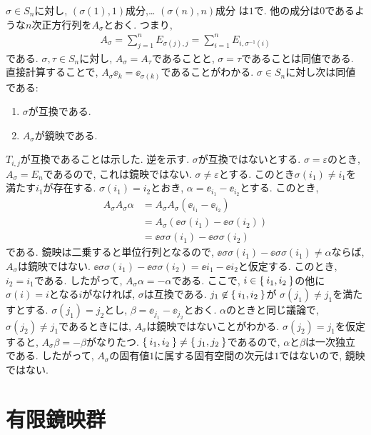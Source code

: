 \begin{example}
  $\sigma \in S_n$に対し,
  $(\sigma(1),1)$成分,\ldots
  $(\sigma(n),n)$成分
  は$1$で. 他の成分は$0$であるような$n$次正方行列を$A_\sigma$とおく.
  つまり,
  \begin{align*}
    A_\sigma = \sum_{j=1}^{n} E_{\sigma(j),j} = \sum_{i=1}^{n} E_{i,\sigma^{-1}(i)}
  \end{align*}
  である.
  $\sigma,\tau\in S_n$に対し, $A_\sigma=A_\tau$であることと,
  $\sigma=\tau$であることは同値である.
  直接計算することで,
  $A_\sigma \ee_k=\ee_{\sigma(k)}$であることがわかる.
  $\sigma\in S_n$に対し次は同値である:
  \begin{enumerate}
  \item $\sigma$が互換である.
  \item $A_\sigma$が鏡映である.
  \end{enumerate}
  $T_{i,j}$が互換であることは示した.
  逆を示す.
  $\sigma$が互換ではないとする.
  $\sigma=\varepsilon$のとき, $A_\sigma=E_n$であるので, これは鏡映ではない.
  $\sigma\neq\varepsilon$とする.
  このとき$\sigma(i_1)\neq i_1$を満たす$i_1$が存在する.
  $\sigma(i_1)=i_2$とおき,
  $\alpha=\ee_{i_1}-\ee_{i_2}$とする.
  このとき,
  \begin{align*}
    A_\sigma A_\sigma\alpha
    &= A_\sigma A_\sigma (\ee_{i_1}-\ee_{i_2})\\
    &= A_\sigma(\ee{\sigma(i_1)}-\ee{\sigma(i_2)})\\
    &= \ee{\sigma\sigma(i_1)}-\ee{\sigma\sigma(i_2)}
  \end{align*}
  である. 鏡映は二乗すると単位行列となるので,
  $\ee{\sigma\sigma(i_1)}-\ee{\sigma\sigma(i_1)}\neq \alpha$ならば,
  $A_\sigma$は鏡映ではない.
  $\ee{\sigma\sigma(i_1)}-\ee{\sigma\sigma(i_2)}=\ee{i_1}-\ee{i_2}$と仮定する.
  このとき, $i_2=i_1$である.
  したがって,  $A_\sigma \alpha = -\alpha$である.
  ここで,
  $i\in \Set{i_1, i_2}$の他に$\sigma(i)=i$となる$i$がなければ, $\sigma$は互換である.
  $j_1\not\in \Set{i_1,i_2}$が
  $\sigma(j_1)\neq j_1$を満たすとする.
  $\sigma(j_1)=j_2$とし, $\beta=\ee_{j_1}-\ee_{j_2}$とおく.
  $\alpha$のときと同じ議論で,
  $\sigma(j_2)\neq j_1$であるときには, $A_\sigma$は鏡映ではないことがわかる.
  $\sigma(j_2)= j_1$を仮定すると, $A_\sigma \beta=-\beta$がなりたつ.
  $\Set{i_1,i_2}\neq \Set{j_1,j_2}$であるので,
  $\alpha$と$\beta$は一次独立である.
  したがって, $A_\sigma$の固有値$1$に属する固有空間の次元は$1$ではないので,
  鏡映ではない.
\end{example}


\chapter{有限鏡映群}

